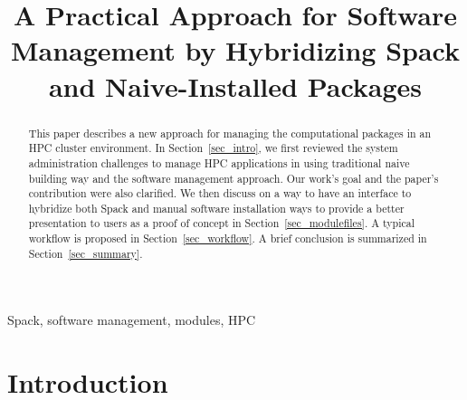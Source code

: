 \documentclass[conference]{IEEEtran}
\begin{document}
\title{A Practical Approach for Software Management by Hybridizing Spack and Naive-Installed Packages\\
}

\author{
\and
{}
}

\maketitle

\begin{abstract}
This paper describes a new approach for managing the computational packages in an HPC cluster environment.
In Section~\ref{sec_intro}, we first reviewed the system administration challenges to manage HPC applications in using traditional naive building way and the software management approach. Our work's goal and the paper's contribution were also clarified.
We then discuss on a way to have an interface to hybridize both Spack and manual software installation ways to provide a better presentation to users as a proof of concept in Section~\ref{sec_modulefiles}. A typical workflow is proposed in Section~\ref{sec_workflow}.  
A brief conclusion is summarized in Section~\ref{sec_summary}.

\end{abstract}

\begin{IEEEkeywords}
Spack, software management, modules, HPC 
\end{IEEEkeywords}

\section{Introduction}\label{sec_intro}
\end{document}
